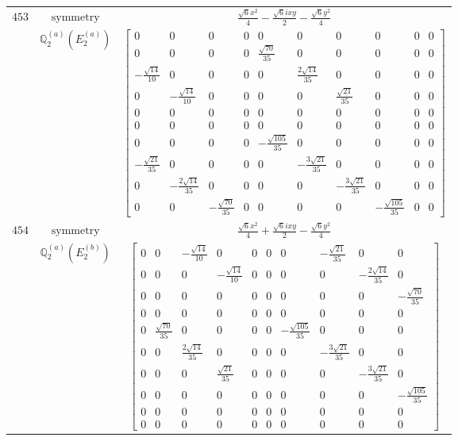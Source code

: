 \documentclass[fleqn,8pt,landscape]{jsarticle}
\begin{document}
\begin{longtable}{ccc}
$ 453 $ & $ \text{symmetry} $ & $ \frac{\sqrt{6} x^{2}}{4} - \frac{\sqrt{6} i x y}{2} - \frac{\sqrt{6} y^{2}}{4} $ \\
$  $ & $ \mathbb{Q}_{2}^{(a)}(E_{2}^{(a)}) $ & $ \begin{bmatrix} 0 & 0 & 0 & 0 & 0 & 0 & 0 & 0 & 0 & 0 \\ 0 & 0 & 0 & 0 & \frac{\sqrt{70}}{35} & 0 & 0 & 0 & 0 & 0 \\ - \frac{\sqrt{14}}{10} & 0 & 0 & 0 & 0 & \frac{2 \sqrt{14}}{35} & 0 & 0 & 0 & 0 \\ 0 & - \frac{\sqrt{14}}{10} & 0 & 0 & 0 & 0 & \frac{\sqrt{21}}{35} & 0 & 0 & 0 \\ 0 & 0 & 0 & 0 & 0 & 0 & 0 & 0 & 0 & 0 \\ 0 & 0 & 0 & 0 & 0 & 0 & 0 & 0 & 0 & 0 \\ 0 & 0 & 0 & 0 & - \frac{\sqrt{105}}{35} & 0 & 0 & 0 & 0 & 0 \\ - \frac{\sqrt{21}}{35} & 0 & 0 & 0 & 0 & - \frac{3 \sqrt{21}}{35} & 0 & 0 & 0 & 0 \\ 0 & - \frac{2 \sqrt{14}}{35} & 0 & 0 & 0 & 0 & - \frac{3 \sqrt{21}}{35} & 0 & 0 & 0 \\ 0 & 0 & - \frac{\sqrt{70}}{35} & 0 & 0 & 0 & 0 & - \frac{\sqrt{105}}{35} & 0 & 0 \end{bmatrix} $ \\ \hline
$ 454 $ & $ \text{symmetry} $ & $ \frac{\sqrt{6} x^{2}}{4} + \frac{\sqrt{6} i x y}{2} - \frac{\sqrt{6} y^{2}}{4} $ \\
$  $ & $ \mathbb{Q}_{2}^{(a)}(E_{2}^{(b)}) $ & $ \begin{bmatrix} 0 & 0 & - \frac{\sqrt{14}}{10} & 0 & 0 & 0 & 0 & - \frac{\sqrt{21}}{35} & 0 & 0 \\ 0 & 0 & 0 & - \frac{\sqrt{14}}{10} & 0 & 0 & 0 & 0 & - \frac{2 \sqrt{14}}{35} & 0 \\ 0 & 0 & 0 & 0 & 0 & 0 & 0 & 0 & 0 & - \frac{\sqrt{70}}{35} \\ 0 & 0 & 0 & 0 & 0 & 0 & 0 & 0 & 0 & 0 \\ 0 & \frac{\sqrt{70}}{35} & 0 & 0 & 0 & 0 & - \frac{\sqrt{105}}{35} & 0 & 0 & 0 \\ 0 & 0 & \frac{2 \sqrt{14}}{35} & 0 & 0 & 0 & 0 & - \frac{3 \sqrt{21}}{35} & 0 & 0 \\ 0 & 0 & 0 & \frac{\sqrt{21}}{35} & 0 & 0 & 0 & 0 & - \frac{3 \sqrt{21}}{35} & 0 \\ 0 & 0 & 0 & 0 & 0 & 0 & 0 & 0 & 0 & - \frac{\sqrt{105}}{35} \\ 0 & 0 & 0 & 0 & 0 & 0 & 0 & 0 & 0 & 0 \\ 0 & 0 & 0 & 0 & 0 & 0 & 0 & 0 & 0 & 0 \end{bmatrix} $ \\ \hline

\end{longtable}
\end{document}
